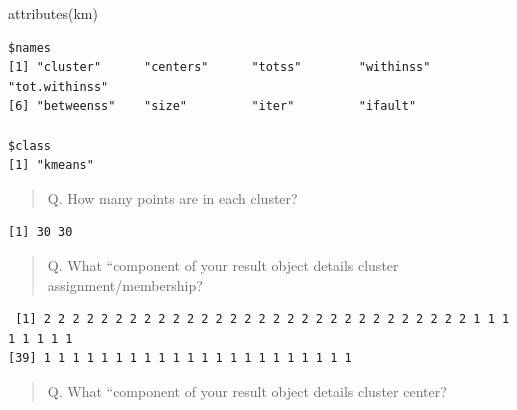 \documentclass[
  letterpaper,
  DIV=11,
  numbers=noendperiod]{scrartcl}
\newenvironment{Shaded}{\begin{snugshade}}{\end{snugshade}}
\newcommand{\FunctionTok}[1]{\textcolor[rgb]{0.28,0.35,0.67}{#1}}
\newcommand{\NormalTok}[1]{\textcolor[rgb]{0.00,0.23,0.31}{#1}}
\newcommand{\SpecialCharTok}[1]{\textcolor[rgb]{0.37,0.37,0.37}{#1}}
\begin{document}
\begin{Shaded}
\begin{Highlighting}[]
\FunctionTok{attributes}\NormalTok{(km)}
\end{Highlighting}
\end{Shaded}

\begin{verbatim}
$names
[1] "cluster"      "centers"      "totss"        "withinss"     "tot.withinss"
[6] "betweenss"    "size"         "iter"         "ifault"      

$class
[1] "kmeans"
\end{verbatim}

\begin{quote}
Q. How many points are in each cluster?
\end{quote}

\begin{Shaded}
\end{Shaded}

\begin{verbatim}
[1] 30 30
\end{verbatim}

\begin{quote}
Q. What ``component of your result object details cluster
assignment/membership?
\end{quote}

\begin{Shaded}
\end{Shaded}

\begin{verbatim}
 [1] 2 2 2 2 2 2 2 2 2 2 2 2 2 2 2 2 2 2 2 2 2 2 2 2 2 2 2 2 2 2 1 1 1 1 1 1 1 1
[39] 1 1 1 1 1 1 1 1 1 1 1 1 1 1 1 1 1 1 1 1 1 1
\end{verbatim}

\begin{quote}
Q. What ``component of your result object details cluster center?
\end{quote}

\begin{Shaded}
\end{Shaded}
\end{document}
